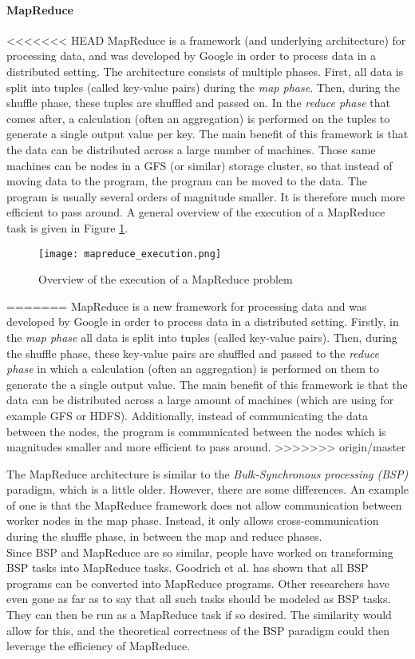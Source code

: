 \paragraph{MapReduce}
<<<<<<< HEAD
MapReduce is a framework (and underlying architecture) for processing data, and was developed by Google\cite{Dean04} in order to process data in a distributed setting. The architecture consists of multiple phases. First, all data is split into tuples (called key-value pairs) during the \textit{map phase}. Then, during the shuffle phase, these tuples are shuffled and passed on. In the \textit{reduce phase} that comes after, a calculation (often an aggregation) is performed on the tuples to generate a single output value per key. The main benefit of this framework is that the data can be distributed across a large number of machines. Those same machines can be nodes in a GFS (or similar) storage cluster, so that instead of moving data to the program, the program can be moved to the data. The program is usually several orders of magnitude smaller. It is therefore much more efficient to pass around. A general overview of the execution of a MapReduce task is given in Figure \ref{mapreduce_execution}.

\begin{figure}
	\texttt{[image: mapreduce\_execution.png]}
	\caption{Overview of the execution of a MapReduce problem\cite{Dean04}}
	\label{mapreduce_execution}
\end{figure}
=======
MapReduce is a new framework for processing data and was developed by Google\cite{Dean04} in order to process data in a distributed setting. Firstly, in the \textit{map phase} all data is split into tuples (called key-value pairs). Then, during the shuffle phase, these key-value pairs are shuffled and passed to the \textit{reduce phase} in which a calculation (often an aggregation) is performed on them to generate the a single output value. The main benefit of this framework is that the data can be distributed across a large amount of machines (which are using for example GFS or HDFS). Additionally, instead of communicating the data between the nodes, the program is communicated between the nodes which is magnitudes smaller and more efficient to pass around.
>>>>>>> origin/master

The MapReduce architecture is similar to the \textit{Bulk-Synchronous processing (BSP)} paradigm, which is a little older. However, there are some differences. An example of one is that the MapReduce framework does not allow communication between worker nodes in the map phase. Instead, it only allows cross-communication during the shuffle phase, in between the map and reduce phases\cite{Pace12}.\\
Since BSP and MapReduce are so similar, people have worked on transforming BSP tasks into MapReduce tasks. Goodrich et al.\cite{Goo11} has shown that all BSP programs can be converted into MapReduce programs. Other researchers have even gone as far as to say that all such tasks should be modeled as BSP tasks. They can then be run as a MapReduce task if so desired. The similarity would allow for this, and the theoretical correctness of the BSP paradigm could then leverage the efficiency of MapReduce\cite{Pace12}.

